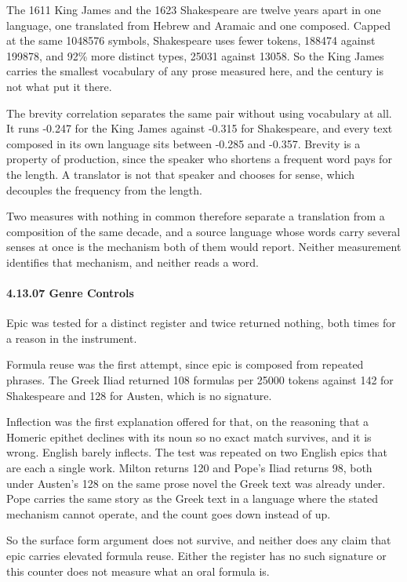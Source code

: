 The 1611 King James and the 1623 Shakespeare are twelve years apart in one language, one translated from Hebrew and Aramaic and one composed. Capped at the same 1048576 symbols, Shakespeare uses fewer tokens, 188474 against 199878, and 92\% more distinct types, 25031 against 13058. So the King James carries the smallest vocabulary of any prose measured here, and the century is not what put it there.

The brevity correlation separates the same pair without using vocabulary at all. It runs -0.247 for the King James against -0.315 for Shakespeare, and every text composed in its own language sits between -0.285 and -0.357. Brevity is a property of production, since the speaker who shortens a frequent word pays for the length. A translator is not that speaker and chooses for sense, which decouples the frequency from the length.

Two measures with nothing in common therefore separate a translation from a composition of the same decade, and a source language whose words carry several senses at once is the mechanism both of them would report. Neither measurement identifies that mechanism, and neither reads a word.

\paragraph{4.13.07 Genre Controls}

Epic was tested for a distinct register and twice returned nothing, both times for a reason in the instrument.

Formula reuse was the first attempt, since epic is composed from repeated phrases. The Greek Iliad returned 108 formulas per 25000 tokens against 142 for Shakespeare and 128 for Austen, which is no signature.

Inflection was the first explanation offered for that, on the reasoning that a Homeric epithet declines with its noun so no exact match survives, and it is wrong. English barely inflects. The test was repeated on two English epics that are each a single work. Milton returns 120 and Pope's Iliad returns 98, both under Austen's 128 on the same prose novel the Greek text was already under. Pope carries the same story as the Greek text in a language where the stated mechanism cannot operate, and the count goes down instead of up.

So the surface form argument does not survive, and neither does any claim that epic carries elevated formula reuse. Either the register has no such signature or this counter does not measure what an oral formula is.

